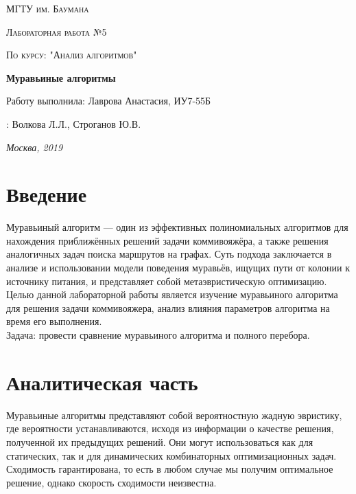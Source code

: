 \documentclass[12pt]{report}
\begin{document}
\begin{titlepage}
	\centering
	{\scshape\LARGE МГТУ им. Баумана \par}
	\vspace{3cm}
	{\scshape\Large Лабораторная работа №5\par}
	\vspace{0.5cm}	
	{\scshape\Large По курсу: "Анализ алгоритмов"\par}
	\vspace{1.5cm}
	{\huge\bfseries Муравьиные алгоритмы\par}
	\vspace{2cm}
	\Large Работу выполнила: Лаврова Анастасия, ИУ7-55Б\par
	\vspace{0.5cm}
	:  Волкова Л.Л., Строганов Ю.В.\par

	\vfill
	\large \textit {Москва, 2019} \par
\end{titlepage}

\tableofcontents

\newpage
\chapter*{Введение}
Муравьиный алгоритм — один из эффективных полиномиальных алгоритмов для нахождения приближённых решений задачи коммивояжёра, а также решения аналогичных задач поиска маршрутов на графах. Суть подхода заключается в анализе и использовании модели поведения муравьёв, ищущих пути от колонии к источнику питания, и представляет собой метаэвристическую оптимизацию.\\

Целью данной лабораторной работы является изучение муравьиного алгоритма для решения задачи коммивояжера, анализ влияния параметров алгоритма на время его выполнения. \\

Задача: провести сравнение муравьиного алгоритма и полного перебора.\\

\chapter{Аналитическая часть}

Муравьиные алгоритмы представляют собой вероятностную жадную эвристику, где вероятности устанавливаются, исходя из информации о 
качестве решения, полученной их предыдущих решений. Они могут использоваться как для статических, так и для динамических комбинаторных оптимизационных задач. Сходимость гарантирована, то есть в любом случае мы получим оптимальное решение, однако скорость сходимости неизвестна.   \\
\end{document}
